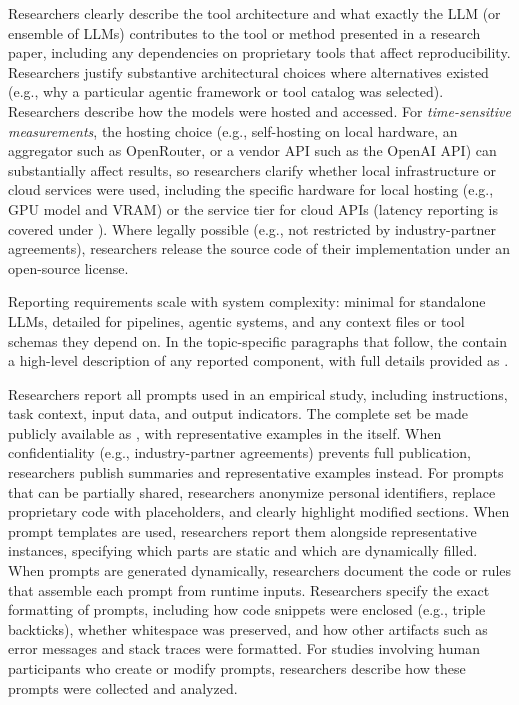 
Researchers \must clearly describe the tool architecture and what exactly the LLM (or ensemble of LLMs) contributes to the tool or method presented in a research paper, including any dependencies on proprietary tools that affect reproducibility.
Researchers \should justify substantive architectural choices where alternatives existed (e.g., why a particular agentic framework or tool catalog was selected).
Researchers \should describe how the models were hosted and accessed. For \emph{time-sensitive measurements}, the hosting choice (e.g., self-hosting on local hardware, an aggregator such as OpenRouter, or a vendor API such as the OpenAI API) can substantially affect results, so researchers \must clarify whether local infrastructure or cloud services were used, including the specific hardware for local hosting (e.g., GPU model and VRAM) or the service tier for cloud APIs (latency reporting is covered under \benchmarksmetrics).
Where legally possible (e.g., not restricted by industry-partner agreements), researchers \should release the source code of their implementation under an open-source license.

Reporting requirements scale with system complexity: minimal for standalone LLMs, detailed for pipelines, agentic systems, and any context files or tool schemas they depend on. In the topic-specific paragraphs that follow, the \paper \must contain a high-level description of any reported component, with full details provided as \supplementarymaterial.

Researchers \must report all prompts used in an empirical study, including instructions, task context, input data, and output indicators.
The complete set \must be made publicly available as \supplementarymaterial, with representative examples in the \paper itself.
When confidentiality (e.g., industry-partner agreements) prevents full publication, researchers \should publish summaries and representative examples instead.
For prompts that can be partially shared, researchers \must anonymize personal identifiers, replace proprietary code with placeholders, and clearly highlight modified sections.
When prompt templates are used, researchers \must report them alongside representative instances, specifying which parts are static and which are dynamically filled.
When prompts are generated dynamically, researchers \must document the code or rules that assemble each prompt from runtime inputs.
Researchers \should specify the exact formatting of prompts, including how code snippets were enclosed (e.g., triple backticks), whether whitespace was preserved, and how other artifacts such as error messages and stack traces were formatted.
For studies involving human participants who create or modify prompts, researchers \should describe how these prompts were collected and analyzed.

